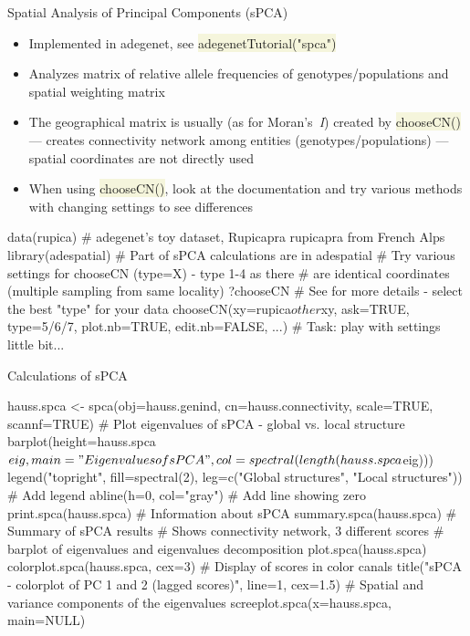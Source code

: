 \documentclass[compress, xelatex, 11pt, xcolor=svgnames, aspectratio=169,
	hyperref={
		bookmarks=true,
		unicode=true,
		colorlinks=true,
		pdftitle={Molecular data in R},
		plainpages=false,
		pdfauthor={Vojtech Zeisek},
		pdfsubject={Course about phylogeny and evolution in R},
		pdfcreator={XeLaTeX},
		pdfkeywords={R, evolution, phylogeny, molecular data},
		linkcolor=Crimson, %
		anchorcolor=Magenta, %
		citecolor=Magenta, %
		filecolor=Magenta, %
		menucolor=Magenta, %
		urlcolor=DodgerBlue, %
		},
	url={hyphens, lowtilde} %
	]{beamer}
\renewcommand{\texttt}[1]{\colorbox{Beige}{{\ttfamily #1}}}
\begin{document}
\begin{frame}[fragile]{Spatial Analysis of Principal Components (sPCA)}
	\begin{itemize}
		\item Implemented in adegenet, see \texttt{adegenetTutorial("spca")}
		\item Analyzes matrix of relative allele frequencies of genotypes/populations and spatial weighting matrix
		\item The geographical matrix is usually (as for Moran's~\textit{I}) created by \texttt{chooseCN()} --- creates connectivity network among entities (genotypes/populations) --- spatial coordinates are not directly used
		\item When using \texttt{chooseCN()}, look at the documentation and try various methods with changing settings to see differences
	\end{itemize}
	\begin{spluscode}
    data(rupica) # adegenet's toy dataset, Rupicapra rupicapra from French Alps
    library(adespatial) # Part of sPCA calculations are in adespatial
    # Try various settings for chooseCN (type=X) - type 1-4 as there
    # are identical coordinates (multiple sampling from same locality)
    ?chooseCN # See for more details - select the best "type" for your data
    chooseCN(xy=rupica$other$xy, ask=TRUE, type=5/6/7, plot.nb=TRUE,
      edit.nb=FALSE, ...) # Task: play with settings little bit...
	\end{spluscode}
\end{frame}

\begin{frame}[fragile]{Calculations of sPCA}
	\begin{spluscode}
    hauss.spca <- spca(obj=hauss.genind, cn=hauss.connectivity,
      scale=TRUE, scannf=TRUE)
    # Plot eigenvalues of sPCA - global vs. local structure
    barplot(height=hauss.spca$eig, main="Eigenvalues of sPCA",
      col=spectral(length(hauss.spca$eig)))
    legend("topright", fill=spectral(2), leg=c("Global structures",
      "Local structures")) # Add legend
    abline(h=0, col="gray") # Add line showing zero
    print.spca(hauss.spca) # Information about sPCA
    summary.spca(hauss.spca) # Summary of sPCA results
    # Shows connectivity network, 3 different scores
    # barplot of eigenvalues and eigenvalues decomposition
    plot.spca(hauss.spca)
    colorplot.spca(hauss.spca, cex=3) # Display of scores in color canals
    title("sPCA - colorplot of PC 1 and 2 (lagged scores)", line=1, cex=1.5)
    # Spatial and variance components of the eigenvalues
    screeplot.spca(x=hauss.spca, main=NULL)
	\end{spluscode}
\end{frame}
\end{document}
